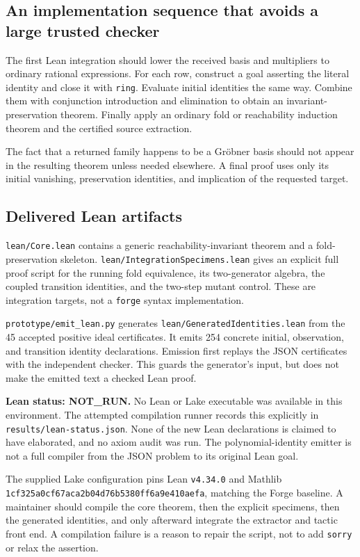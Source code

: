\documentclass[11pt,letterpaper]{article}
\theoremstyle{definition}
\newcommand{\code}[1]{\nolinkurl{#1}}
\begin{document}
\subsection{An implementation sequence that avoids a large trusted checker}
The first Lean integration should lower the received basis and multipliers to
ordinary rational expressions. For each row, construct a goal asserting the
literal identity and close it with \code{ring}. Evaluate initial identities the
same way. Combine them with conjunction introduction and elimination to obtain
an invariant-preservation theorem. Finally apply an ordinary fold or
reachability induction theorem and the certified source extraction.

The fact that a returned family happens to be a Gr\"obner basis should not
appear in the resulting theorem unless needed elsewhere. A final proof uses
only its initial vanishing, preservation identities, and implication of the
requested target.

\subsection{Delivered Lean artifacts}
\code{lean/Core.lean} contains a generic reachability-invariant theorem and a
fold-preservation skeleton. \code{lean/IntegrationSpecimens.lean} gives an
explicit full proof script for the running fold equivalence, its two-generator
algebra, the coupled transition identities, and the two-step mutant control.
These are integration targets, not a \code{forge} syntax implementation.

\code{prototype/emit_lean.py} generates \code{lean/GeneratedIdentities.lean}
from the 45 accepted positive ideal certificates. It emits 254 concrete
initial, observation, and transition identity declarations. Emission first
replays the JSON certificates with the independent checker. This guards the
generator's input, but does not make the emitted text a checked Lean proof.

\begin{focusbox}
\textbf{Lean status: NOT\_RUN.} No Lean or Lake executable was available in this
environment. The attempted compilation runner records this explicitly in
\code{results/lean-status.json}. None of the new Lean declarations is claimed
to have elaborated, and no axiom audit was run. The polynomial-identity emitter
is not a full compiler from the JSON problem to its original Lean goal.
\end{focusbox}

The supplied Lake configuration pins Lean \code{v4.34.0} and Mathlib
\code{1cf325a0cf67aca2b04d76b5380ff6a9e410aefa}, matching the Forge baseline.
A maintainer should compile the core theorem, then the explicit specimens, then
the generated identities, and only afterward integrate the extractor and tactic
front end. A compilation failure is a reason to repair the script, not to add
\code{sorry} or relax the assertion.
\end{document}
